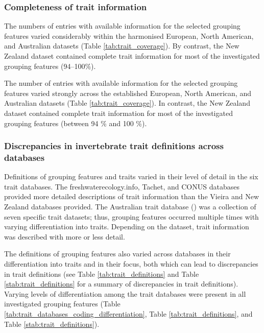 \documentclass[12pt]{article}
\begin{document}
\subsubsection*{Completeness of trait information}

The numbers of entries with available information for the selected grouping features varied considerably within the harmonised European, North American, and Australian datasets (Table \ref{tab:trait_coverage}). By contrast, the New Zealand dataset contained complete trait information for most of the investigated grouping features (94–100\%).

The number of entries with available information for the selected grouping features varied strongly across the established European, North American, and Australian datasets (Table \ref{tab:trait_coverage}). In contrast, the New Zealand dataset contained complete trait information for most of the investigated grouping features (between 94 \% and 100 \%).


\subsubsection*{Discrepancies in invertebrate trait definitions across databases}

Definitions of grouping features and traits varied in their level of detail in the six trait databases. The freshwaterecology.info, Tachet, and CONUS databases provided more detailed descriptions of trait information than the Vieira and New Zealand databases provided. The Australian trait database (\cite{kefford_integrated_2020}) was a collection of seven specific trait datasets; thus, grouping features occurred multiple times with varying differentiation into traits. Depending on the dataset, trait information was described with more or less detail.

The definitions of grouping features also varied across databases in their differentiation into traits and in their focus, both which can lead to discrepancies in trait definitions (see Table \ref{tab:trait_definitions} and Table \ref{stab:trait_definitions} for a summary of discrepancies in trait definitions). Varying levels of differentiation among the trait databases were present in all investigated grouping features (Table \ref{tab:trait_databases_coding_differentiation}, Table \ref{tab:trait_definitions}, and Table \ref{stab:trait_definitions}).
\end{document}
